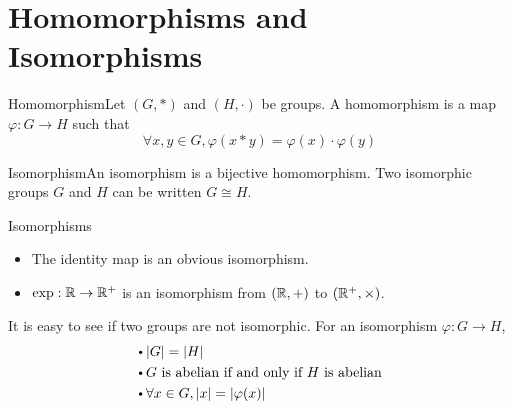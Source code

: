 \documentclass{report}
\newcommand{\ex}[2]{\begin{Example}{#1}{}#2\end{Example}}
\newcommand{\dfn}[2]{\begin{Definition}[colbacktitle=red!75!black]{#1}{}#2\end{Definition}}
\begin{document}
\section{Homomorphisms and Isomorphisms}
\dfn{Homomorphism}{Let $(G,*)$ and $(H, \cdot)$ be groups. A homomorphism is a map $\varphi : G \rightarrow H$ such that $$\forall x,y \in G, \varphi (x * y) = \varphi(x)\cdot\varphi(y)$$}
\dfn{Isomorphism}{An isomorphism is a bijective homomorphism. Two isomorphic groups $G$ and $H$ can be written $G \cong H$.}
\ex{Isomorphisms}{\begin{itemize}
    \item The identity map is an obvious isomorphism.
    \item $\exp : \mathbb{R} \rightarrow \mathbb{R}^+$ is an isomorphism from $(\mathbb{R}, +)$ to $(\mathbb{R}^+,\times)$.
\end{itemize}}
It is easy to see if two groups are not isomorphic. For an isomorphism $\varphi : G \rightarrow H$, 
\begin{align*}
    &{\vcenter{\hbox{\tiny$\bullet$}}} \hspace{2pt} |G|=|H| \\
    &{\vcenter{\hbox{\tiny$\bullet$}}} \hspace{2pt} G\text{ is abelian if and only if $H$ is abelian}\\
    &{\vcenter{\hbox{\tiny$\bullet$}}} \hspace{2pt} \forall x \in G, |x| = |\varphi(x)|\\
\end{align*}
\end{document}
